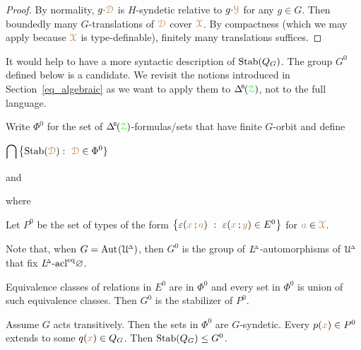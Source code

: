 \begin{proof}
%
  By normality, $g{\cdot}{\color{brown}\EuScript D}$ is $H$-syndetic relative to $g{\cdot}{\color{brown}\EuScript Y}$ for any $g\in G$.
  Then boundedly many $G$-translations of ${\color{brown}\EuScript D}$ cover ${\color{brown}\EuScript X}$.
  By compactness (which we may apply because ${\color{brown}\EuScript X}$ is type-definable), finitely many translations suffices.
\end{proof}

It would help to have a more syntactic description of ${\rm Stab}(Q_G)$.
The group $G^0$ defined below is a candidate. %
We revisit the notions introduced in Section~\ref{eq_algebraic} as we want to apply them to $\BDelta(\grZ)$, not to the full language.%

\begin{definition}\label{def_G0}
  Write \emph{$\Phi^0$\/} for the set of $\BDelta(\grZ)$-formulas/sets that have finite $G$-orbit and define%

  \medrel{=}$\displaystyle\bigcap\big\{{\rm Stab}({\color{brown}\EuScript D}) :\  {\color{brown}\EuScript D}\in\Phi^0\}$

  and%

  
  where%


  Let $P^0$ be the set of types of the form $\big\{\varepsilon({\color{brown} x}\,;{\color{brown} a})\ :\ \varepsilon({\color{brown} x}\,;{\color{brown} y})\in E^0\big\}$ for ${\color{brown} a}\in{\color{brown}\EuScript X}$.
\end{definition}

Note that, when $G={\rm Aut\kern.15ex}(\EuScript U\kern-.2ex^{\scriptscriptstyle\Delta})$, then $G^0$ is the group of $L\kern-.5ex^{\scriptscriptstyle\Delta}$-automorphisms of $\EuScript U\kern-.2ex^{\scriptscriptstyle\Delta}$ that fix $L\kern-.5ex^{\scriptscriptstyle\Delta}\mbox-{\rm acl}^{{\rm eq}}\varnothing$.%

\begin{remark}\label{lem_trans_action}
  Equivalence classes of relations in $E^0$ are in $\Phi^0$ and every set in $\Phi^0$ is union of such equivalence classes.
  Then $G^0$ is the stabilizer of $P^0$.\smallskip

  Assume $G$ acts transitively.
  Then the sets in $\Phi^0$ are $G$-syndetic.
  Every $p({\color{brown} x})\in P^0$ extends to some $q({\color{brown} x})\in Q_G$.
  Then ${\rm Stab}(Q_G)\le G^0$.
\end{remark}

